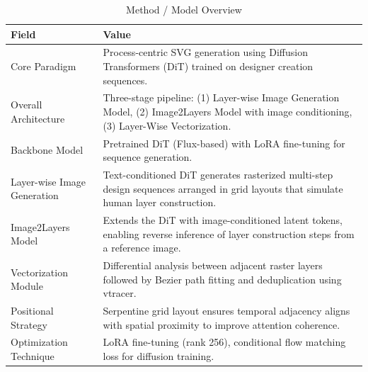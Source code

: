 \begin{table}[h!]
\centering
\caption{Method / Model Overview}
\begin{tabular}{|l|p{10cm}|}
\hline
\textbf{Field} & \textbf{Value} \\ \hline
Core Paradigm &
Process-centric SVG generation using Diffusion Transformers (DiT) trained on designer creation sequences. \\ \hline
Overall Architecture &
Three-stage pipeline: (1) Layer-wise Image Generation Model, (2) Image2Layers Model with image conditioning, (3) Layer-Wise Vectorization. \\ \hline
Backbone Model &
Pretrained DiT (Flux-based) with LoRA fine-tuning for sequence generation. \\ \hline
Layer-wise Image Generation &
Text-conditioned DiT generates rasterized multi-step design sequences arranged in grid layouts that simulate human layer construction. \\ \hline
Image2Layers Model &
Extends the DiT with image-conditioned latent tokens, enabling reverse inference of layer construction steps from a reference image. \\ \hline
Vectorization Module &
Differential analysis between adjacent raster layers followed by Bezier path fitting and deduplication using vtracer. \\ \hline
Positional Strategy &
Serpentine grid layout ensures temporal adjacency aligns with spatial proximity to improve attention coherence. \\ \hline
Optimization Technique &
LoRA fine-tuning (rank 256), conditional flow matching loss for diffusion training. \\ \hline
\end{tabular}
\end{table}


